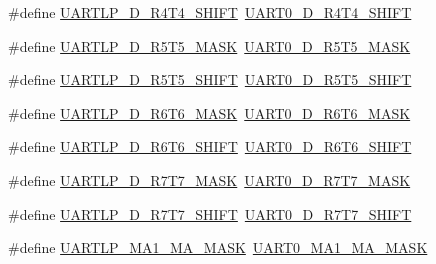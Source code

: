 \begin{DoxyCompactItemize}
\item 
\#define \hyperlink{group___backward___compatibility___symbols_gab6c3b555bd24f99faf903fca53e04b11}{U\+A\+R\+T\+L\+P\+\_\+\+D\+\_\+\+R4\+T4\+\_\+\+S\+H\+I\+FT}~\hyperlink{group___u_a_r_t0___register___masks_gae0e84ea8d517404064d82a8fac69e39a}{U\+A\+R\+T0\+\_\+\+D\+\_\+\+R4\+T4\+\_\+\+S\+H\+I\+FT}
\item 
\#define \hyperlink{group___backward___compatibility___symbols_gac7792e726a24f4d48b8c401c854dbfbe}{U\+A\+R\+T\+L\+P\+\_\+\+D\+\_\+\+R5\+T5\+\_\+\+M\+A\+SK}~\hyperlink{group___u_a_r_t0___register___masks_gaaeccc9a4eea797b215e73defa6eb7fbb}{U\+A\+R\+T0\+\_\+\+D\+\_\+\+R5\+T5\+\_\+\+M\+A\+SK}
\item 
\#define \hyperlink{group___backward___compatibility___symbols_ga7dc8ab69f890eae57d8f33dd89bcae94}{U\+A\+R\+T\+L\+P\+\_\+\+D\+\_\+\+R5\+T5\+\_\+\+S\+H\+I\+FT}~\hyperlink{group___u_a_r_t0___register___masks_gad5485d0f250bb194d8c7722f76666178}{U\+A\+R\+T0\+\_\+\+D\+\_\+\+R5\+T5\+\_\+\+S\+H\+I\+FT}
\item 
\#define \hyperlink{group___backward___compatibility___symbols_gaf6bdbb0511877a1daf3a0f24949f04d7}{U\+A\+R\+T\+L\+P\+\_\+\+D\+\_\+\+R6\+T6\+\_\+\+M\+A\+SK}~\hyperlink{group___u_a_r_t0___register___masks_gad555e177bcea7c90924e5a98be00380c}{U\+A\+R\+T0\+\_\+\+D\+\_\+\+R6\+T6\+\_\+\+M\+A\+SK}
\item 
\#define \hyperlink{group___backward___compatibility___symbols_gaf522e3a2789a7bf0912c309036f2f3b7}{U\+A\+R\+T\+L\+P\+\_\+\+D\+\_\+\+R6\+T6\+\_\+\+S\+H\+I\+FT}~\hyperlink{group___u_a_r_t0___register___masks_ga1083033a9d6894a5c264dac4f7dc67ce}{U\+A\+R\+T0\+\_\+\+D\+\_\+\+R6\+T6\+\_\+\+S\+H\+I\+FT}
\item 
\#define \hyperlink{group___backward___compatibility___symbols_gac4d9354f0bdb6c5e9eac60835c37bb0a}{U\+A\+R\+T\+L\+P\+\_\+\+D\+\_\+\+R7\+T7\+\_\+\+M\+A\+SK}~\hyperlink{group___u_a_r_t0___register___masks_gab3a6b86f1cf57c7559bd4200509a354b}{U\+A\+R\+T0\+\_\+\+D\+\_\+\+R7\+T7\+\_\+\+M\+A\+SK}
\item 
\#define \hyperlink{group___backward___compatibility___symbols_gab2a3957242355f16f9523cdba45c32b6}{U\+A\+R\+T\+L\+P\+\_\+\+D\+\_\+\+R7\+T7\+\_\+\+S\+H\+I\+FT}~\hyperlink{group___u_a_r_t0___register___masks_gabe35832ee13e5e5b6ab53ad6f357bac2}{U\+A\+R\+T0\+\_\+\+D\+\_\+\+R7\+T7\+\_\+\+S\+H\+I\+FT}
\item 
\#define \hyperlink{group___backward___compatibility___symbols_ga187ea00ba1985df3b626c8d88897d693}{U\+A\+R\+T\+L\+P\+\_\+\+M\+A1\+\_\+\+M\+A\+\_\+\+M\+A\+SK}~\hyperlink{group___u_a_r_t0___register___masks_ga9eedde4d09d80e7f305d5217aa6b894f}{U\+A\+R\+T0\+\_\+\+M\+A1\+\_\+\+M\+A\+\_\+\+M\+A\+SK}

\end{DoxyCompactItemize}
